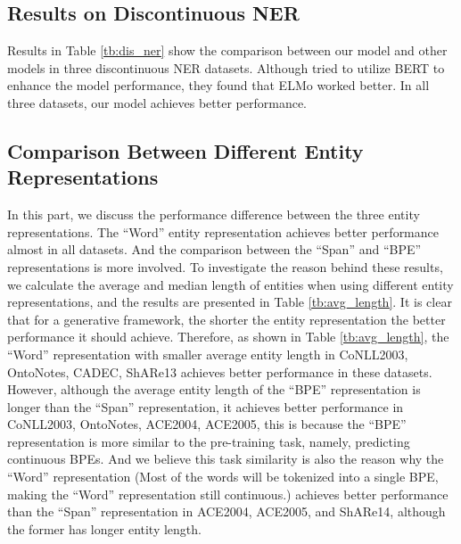 \documentclass[11pt,a4paper]{article}
\begin{document}
\subsection{Results on Discontinuous NER}
Results in Table \ref{tb:dis_ner} show the comparison between our model and other models in three discontinuous NER datasets. Although \citet{DBLP:conf/acl/DaiKHP20} tried to utilize BERT to enhance the model performance, they found that ELMo worked better. In all three datasets, our model achieves better performance.

\subsection{Comparison Between Different Entity Representations} \label{sec:three_spec}
In this part, we discuss the performance difference between the three entity representations.
The ``Word'' entity representation achieves better performance almost in all datasets. And the comparison between the ``Span'' and ``BPE'' representations is more involved. To investigate the reason behind these results, we calculate the average and median length of entities when using different entity representations, and the results are presented in Table \ref{tb:avg_length}. It is clear that for a generative framework, the shorter the entity representation the better performance it should achieve. Therefore, as shown in Table \ref{tb:avg_length}, the ``Word'' representation with smaller average entity length in CoNLL2003, OntoNotes, CADEC, ShARe13 achieves better performance in these datasets. However, although the average entity length of the ``BPE'' representation is longer than the ``Span'' representation, it achieves better performance in CoNLL2003, OntoNotes, ACE2004, ACE2005, this is because the ``BPE'' representation is more similar to the pre-training task, namely, predicting continuous BPEs. And we believe this task similarity is also the reason why the ``Word'' representation (Most of the words will be tokenized into a single BPE, making the ``Word'' representation still continuous.) achieves better performance than the ``Span'' representation in ACE2004, ACE2005, and ShARe14, although the former has longer entity length.
\end{document}
